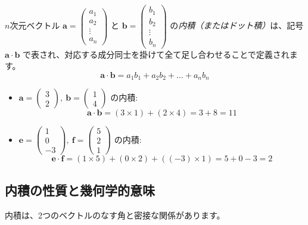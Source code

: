 \begin{dfn}[内積 - 成分による計算] \label{inner_product}
$n$次元ベクトル $\bm{a} = \begin{pmatrix} a_1 \\ a_2 \\ \vdots \\ a_n \end{pmatrix}$ と $\bm{b} = \begin{pmatrix} b_1 \\ b_2 \\ \vdots \\ b_n \end{pmatrix}$ の\emph{内積（またはドット積）}は、記号 $\bm{a} \cdot \bm{b}$ で表され、対応する成分同士を掛けて全て足し合わせることで定義されます。
\[\bm{a} \cdot \bm{b} = a_1 b_1 + a_2 b_2 + \dots + a_n b_n\]
\end{dfn}

\begin{ex}
\begin{itemize}
\item $\bm{a} = \begin{pmatrix} 3 \\ 2 \end{pmatrix},\ \bm{b} = \begin{pmatrix} 1 \\ 4 \end{pmatrix}$ の内積:
    \[\bm{a} \cdot \bm{b} = (3 \times 1) + (2 \times 4) = 3 + 8 = 11\]
\item $\bm{e} = \begin{pmatrix} 1 \\ 0 \\ -3 \end{pmatrix},\ \bm{f} = \begin{pmatrix} 5 \\ 2 \\ 1 \end{pmatrix}$ の内積:
    \[\bm{e} \cdot \bm{f} = (1 \times 5) + (0 \times 2) + ((-3) \times 1) = 5 + 0 - 3 = 2\]
\end{itemize}
\end{ex}

\subsection{内積の性質と幾何学的意味}

内積は、2つのベクトルのなす角と密接な関係があります。

